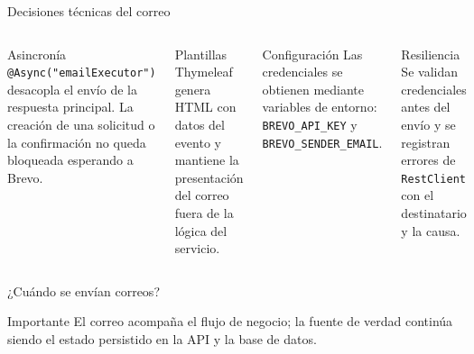 \documentclass[aspectratio=169,11pt]{beamer}
\begin{document}
\begin{frame}{Decisiones técnicas del correo}
  \begin{columns}[T]
      \begin{block}{Asincronía}
        \texttt{@Async("emailExecutor")} desacopla el envío de la respuesta
        principal. La creación de una solicitud o la confirmación no queda
        bloqueada esperando a Brevo.
      \end{block}
      \begin{block}{Plantillas}
        Thymeleaf genera HTML con datos del evento y mantiene la presentación
        del correo fuera de la lógica del servicio.
      \end{block}
      \begin{block}{Configuración}
        Las credenciales se obtienen mediante variables de entorno:
        \texttt{BREVO\_API\_KEY} y \texttt{BREVO\_SENDER\_EMAIL}.
      \end{block}
      \begin{block}{Resiliencia}
        Se validan credenciales antes del envío y se registran errores de
        \texttt{RestClient} con el destinatario y la causa.
      \end{block}
  \end{columns}
\end{frame}

\begin{frame}{¿Cuándo se envían correos?}
\small
{}
\vspace{0.25cm}
\begin{alertblock}{Importante}
  El correo acompaña el flujo de negocio; la fuente de verdad continúa siendo
  el estado persistido en la API y la base de datos.
\end{alertblock}
\end{frame}
\end{document}
